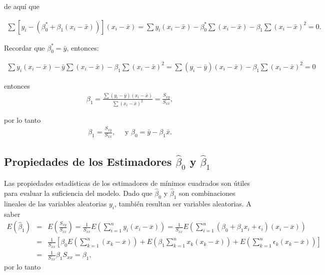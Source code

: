 \documentclass[12pt]{article}
\begin{document}
de aqu\'i que 

\begin{eqnarray*}
\sum \left[ y_i - \left( \beta_0^* + \beta_1 (x_i - \bar{x}) \right) \right](x_i - \bar{x})=\sum y_i (x_i - \bar{x}) - \beta_0^* \sum (x_i - \bar{x}) - \beta_1 \sum (x_i - \bar{x})^2 = 0.
\end{eqnarray*}

Recordar que $\beta_0^* = \bar{y}$, entonces:

\begin{eqnarray*}
\sum y_i (x_i - \bar{x}) - \bar{y} \sum (x_i - \bar{x}) - \beta_1 \sum (x_i - \bar{x})^2 = \sum (y_i - \bar{y})(x_i - \bar{x}) - \beta_1 \sum (x_i - \bar{x})^2 = 0
\end{eqnarray*}

entonces 
\begin{eqnarray*}
 \beta_1 = \frac{\sum (y_i - \bar{y})(x_i - \bar{x})}{\sum (x_i - \bar{x})^2} = \frac{S_{xy}}{S_{xx}},
\end{eqnarray*}

por lo tanto
\begin{eqnarray}
\boxed{ \beta_1 = \frac{S_{xy}}{S_{xx}}, } \quad \textrm{ y }\boxed{ \beta_0 = \bar{y} - \beta_1 \bar{x}.}
\end{eqnarray}


\subsection{Propiedades de los Estimadores $\hat{\beta}_{0}$ y $\hat{\beta}_{1}$}
Las propiedades estad\'isticas de los estimadores de m\'inimos cuadrados son \'utiles para evaluar la suficiencia del modelo. Dado que $\hat{\beta}_{0}$ y  $\hat{\beta}_{1}$ son combinaciones lineales de las variables aleatorias $y_{i}$, tambi\'en resultan ser variables aleatorias. A saber
\begin{eqnarray*}
E\left(\hat{\beta}_{1}\right)&=&E\left(\frac{S_{xy}}{S_{xx}}\right)=\frac{1}{S_{xx}}E\left(\sum_{i=1}^{n}y_{i}\left(x_{i}-\overline{x}\right)\right)=\frac{1}{S_{xx}}E\left(\sum_{i=1}^{n}\left(\beta_{0}+\beta_{1}x_{i}+\epsilon_{i}\right)\left(x_{i}-\overline{x}\right)\right)\\
&=&\frac{1}{S_{xx}}\left[\beta_{0}E\left(\sum_{k=1}^{n}\left(x_{k}-\overline{x}\right)\right)+E\left(\beta_{1}\sum_{k=1}^{n}x_{k}\left(x_{k}-\overline{x}\right)\right)+E\left(\sum_{k=1}^{n}\epsilon_{k}\left(x_{k}-\overline{x}\right)\right)\right]\\
&=&\frac{1}{S_{xx}}\beta_{1}S_{xx}=\beta_{1},
\end{eqnarray*}
por lo tanto 
\end{document}
